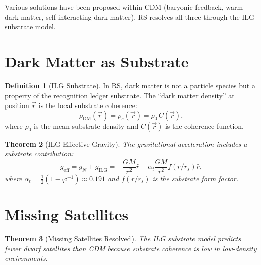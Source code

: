 \documentclass[12pt,a4paper]{article}
\newtheorem{theorem}{Theorem}[section]
\theoremstyle{definition}
\newtheorem{definition}[theorem]{Definition}
\theoremstyle{remark}
\begin{document}
Various solutions have been proposed within CDM (baryonic feedback,
warm dark matter, self-interacting dark matter).  RS resolves all
three through the ILG substrate model.

\section{Dark Matter as Substrate}
\label{sec:substrate}

\begin{definition}[ILG Substrate]
In RS, dark matter is not a particle species but a property of the
recognition ledger substrate.  The ``dark matter density'' at
position $\vec{r}$ is the local substrate coherence:
\begin{equation}
  \rho_{\mathrm{DM}}(\vec{r}) = \rho_s(\vec{r})
  = \rho_0\,C(\vec{r}),
\end{equation}
where $\rho_0$ is the mean substrate density and $C(\vec{r})$ is
the coherence function.
\end{definition}

\begin{theorem}[ILG Effective Gravity]
The gravitational acceleration includes a substrate contribution:
\begin{equation}
  g_{\mathrm{eff}} = g_N + g_{\mathrm{ILG}}
  = -\frac{GM}{r^2}\hat{r} - \alpha_t\frac{GM}{r^2}
  f(r/r_s)\hat{r},
\end{equation}
where $\alpha_t = \tfrac{1}{2}(1 - \varphi^{-1}) \approx 0.191$
and $f(r/r_s)$ is the substrate form factor.
\end{theorem}

\section{Missing Satellites}
\label{sec:missing}

\begin{theorem}[Missing Satellites Resolved]
The ILG substrate model predicts fewer dwarf satellites than CDM
because substrate coherence is low in low-density environments.
\end{theorem}
\end{document}
